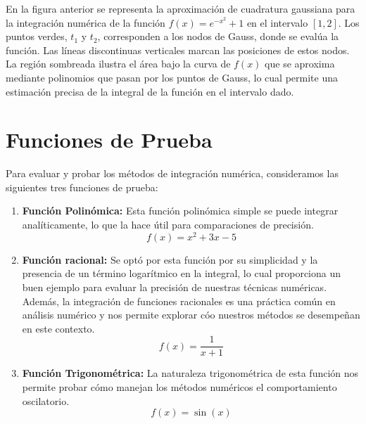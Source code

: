 \documentclass[a4paper]{article}
\begin{document}
    En la figura anterior se representa la aproximación de cuadratura gaussiana para la integración numérica de la función $f(x) = e^{-x^2} + 1$ en el intervalo $[1, 2]$. Los puntos verdes, $t_1$ y $t_2$, corresponden a los nodos de Gauss, donde se evalúa la función. Las líneas discontinuas verticales marcan las posiciones de estos nodos. La región sombreada ilustra el área bajo la curva de $f(x)$ que se aproxima mediante polinomios que pasan por los puntos de Gauss, lo cual permite una estimación precisa de la integral de la función en el intervalo dado.



    \section{Funciones de Prueba}
	\label{sec:funciones}
    Para evaluar y probar los métodos de integración numérica, consideramos las siguientes tres 	
    funciones de prueba:

    \begin{enumerate}
    
      \item \textbf{Función Polinómica:}
       Esta función polinómica simple se puede integrar analíticamente, lo que la hace útil para 
       comparaciones de precisión.
      \begin{equation}
      f(x) = x^2 + 3x - 5
      \end{equation}
    
      \item \textbf{Función racional:}
       Se optó por esta función por su simplicidad y la presencia de un término logarítmico en la 	
       integral, lo cual proporciona un buen ejemplo para evaluar la precisión de nuestras técnicas 
       numéricas. Además, la integración de funciones racionales es una práctica común en análisis 
       numérico y nos permite explorar cóo nuestros métodos se desempeñan en este contexto.
      \begin{equation}
      f(x) = \frac{1}{x + 1}
      \end{equation}

       \item \textbf{Función Trigonométrica:}
       La naturaleza trigonométrica de esta función nos permite probar cómo manejan los métodos
       numéricos el comportamiento oscilatorio.
      \begin{equation}
      f(x) = \sin(x)
      \end{equation}
    
    \end{enumerate}
\end{document}
